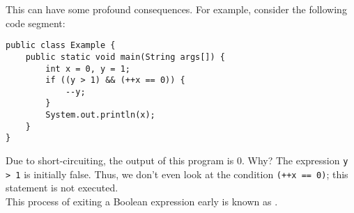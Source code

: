 This can have some profound consequences. For example, consider the following code segment:

\begin{lstlisting}
public class Example {
    public static void main(String args[]) {
        int x = 0, y = 1;
        if ((y > 1) && (++x == 0)) {
            --y;
        }
        System.out.println(x);
    }
}
\end{lstlisting}

Due to short-circuiting, the output of this program is $0$. Why? The expression \verb!y > 1! is initially false. Thus, we don't even look at the condition \verb!(++x == 0)!; this statement is not executed. \\

This process of exiting a Boolean expression early is known as . 
